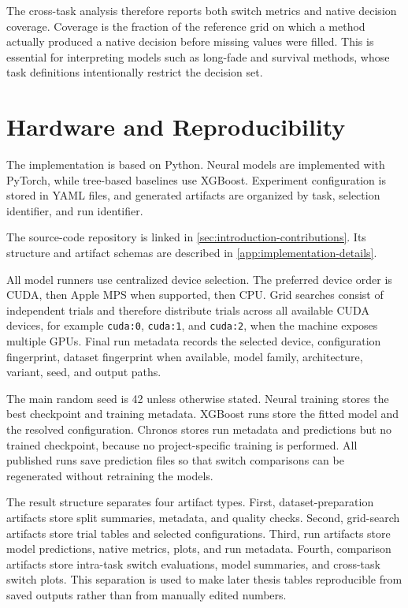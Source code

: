The cross-task analysis therefore reports both switch metrics and native
decision coverage. Coverage is the fraction of the reference grid on which a
method actually produced a native decision before missing values were filled.
This is essential for interpreting models such as long-fade and survival
methods, whose task definitions intentionally restrict the decision set.

\section{Hardware and Reproducibility}
\label{sec:hardware-reproducibility}

The implementation is based on Python. Neural models are implemented with
PyTorch, while tree-based baselines use XGBoost. Experiment configuration is
stored in YAML files, and generated artifacts are organized by task, selection
identifier, and run identifier.

The source-code repository is linked in \cref{sec:introduction-contributions}.
Its structure and artifact schemas are described in
\cref{app:implementation-details}.

All model runners use centralized device selection. The preferred device order
is CUDA, then Apple MPS when supported, then CPU. Grid searches consist of
independent trials and therefore distribute trials across all available CUDA
devices, for example \texttt{cuda:0}, \texttt{cuda:1}, and \texttt{cuda:2}, when
the machine exposes multiple GPUs. Final run metadata records the selected
device, configuration fingerprint, dataset fingerprint when available, model
family, architecture, variant, seed, and output paths.

The main random seed is 42 unless otherwise stated. Neural training stores the
best checkpoint and training metadata. XGBoost runs store the fitted model and
the resolved configuration. Chronos stores run metadata and predictions but no
trained checkpoint, because no project-specific training is performed. All
published runs save prediction files so that switch comparisons can be
regenerated without retraining the models.

The result structure separates four artifact types. First, dataset-preparation
artifacts store split summaries, metadata, and quality checks. Second,
grid-search artifacts store trial tables and selected configurations. Third,
run artifacts store model predictions, native metrics, plots, and run metadata.
Fourth, comparison artifacts store intra-task switch evaluations, model
summaries, and cross-task switch plots. This separation is used to make later
thesis tables reproducible from saved outputs rather than from manually edited
numbers.
